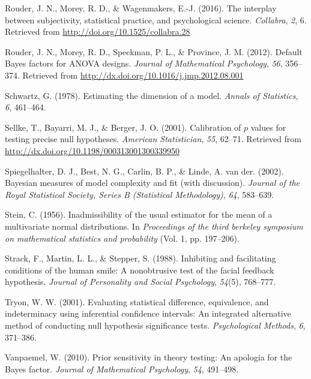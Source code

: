 \documentclass[english,man]{apa6}
\theoremstyle{definition}
\theoremstyle{definition}
\theoremstyle{definition}
\theoremstyle{remark}
\begin{document}
\hypertarget{ref-Rouder:etal:2016b}{}
Rouder, J. N., Morey, R. D., \& Wagenmakers, E.-J. (2016). The interplay
between subjectivity, statistical practice, and psychological science.
\emph{Collabra}, \emph{2}, 6. Retrieved from
\url{http://doi.org/10.1525/collabra.28}

\hypertarget{ref-Rouder:etal:2012}{}
Rouder, J. N., Morey, R. D., Speckman, P. L., \& Province, J. M. (2012).
Default Bayes factors for ANOVA designs. \emph{Journal of Mathematical
Psychology}, \emph{56}, 356--374. Retrieved from
\url{http://dx.doi.org/10.1016/j.jmp.2012.08.001}

\hypertarget{ref-Schwartz:1978}{}
Schwartz, G. (1978). Estimating the dimension of a model. \emph{Annals
of Statistics}, \emph{6}, 461--464.

\hypertarget{ref-Sellke:etal:2001}{}
Sellke, T., Bayarri, M. J., \& Berger, J. O. (2001). Calibration of
\(p\) values for testing precise null hypotheses. \emph{American
Statistician}, \emph{55}, 62--71. Retrieved from
\url{http://dx.doi.org/10.1198/000313001300339950}

\hypertarget{ref-Spiegelhalter:etal:2002}{}
Spiegelhalter, D. J., Best, N. G., Carlin, B. P., \& Linde, A. van der.
(2002). Bayesian measures of model complexity and fit (with discussion).
\emph{Journal of the Royal Statistical Society, Series B (Statistical
Methodology)}, \emph{64}, 583--639.

\hypertarget{ref-Stein:1956}{}
Stein, C. (1956). Inadmissibility of the usual estimator for the mean of
a multivariate normal distributions. In \emph{Proceedings of the third
berkeley symposium on mathematical statistics and probability} (Vol. 1,
pp. 197--206).

\hypertarget{ref-Strack:etal:1988}{}
Strack, F., Martin, L. L., \& Stepper, S. (1988). Inhibiting and
facilitating conditions of the human smile: A nonobtrusive test of the
facial feedback hypothesis. \emph{Journal of Personality and Social
Psychology}, \emph{54}(5), 768--777.

\hypertarget{ref-Tryon:2001}{}
Tryon, W. W. (2001). Evaluating statistical difference, equivalence, and
indeterminacy using inferential confidence intervals: An integrated
alternative method of conducting null hypothesis significance tests.
\emph{Psychological Methods}, \emph{6}, 371--386.

\hypertarget{ref-Vanpaemel:2010}{}
Vanpaemel, W. (2010). Prior sensitivity in theory testing: An apologia
for the Bayes factor. \emph{Journal of Mathematical Psychology},
\emph{54}, 491--498.
\end{document}
